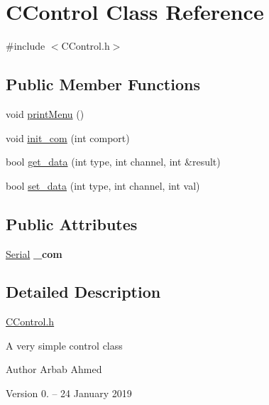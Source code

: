 \hypertarget{class_c_control}{}\section{C\+Control Class Reference}
\label{class_c_control}


{\ttfamily \#include $<$C\+Control.\+h$>$}

\subsection*{Public Member Functions}
\begin{DoxyCompactItemize}
\item 
void \hyperlink{class_c_control_abb8d08a0530b4f5e85c688c314dd6c2d}{print\+Menu} ()
\item 
void \hyperlink{class_c_control_a3d1384d0e1ee2a4a478a798b46457468}{init\+\_\+com} (int comport)
\item 
bool \hyperlink{class_c_control_a0bad8e51e54cb6f1e2a7b51d3a3940d3}{get\+\_\+data} (int type, int channel, int \&result)
\item 
bool \hyperlink{class_c_control_a13f557815616ef66a8f5dd4b725d8c32}{set\+\_\+data} (int type, int channel, int val)
\end{DoxyCompactItemize}
\subsection*{Public Attributes}
\begin{DoxyCompactItemize}
\item 
\hypertarget{class_c_control_aef87fbcfdcd323b1fdcf41be993e006c}{}\label{class_c_control_aef87fbcfdcd323b1fdcf41be993e006c} 
\hyperlink{class_serial}{Serial} {\bfseries \+\_\+com}
\end{DoxyCompactItemize}


\subsection{Detailed Description}
\hyperlink{_c_control_8h_source}{C\+Control.\+h}

A very simple control class

\begin{DoxyAuthor}{Author}
Arbab Ahmed
\end{DoxyAuthor}
\begin{DoxyVersion}{Version}
0. -- 24 January 2019 
\end{DoxyVersion}


